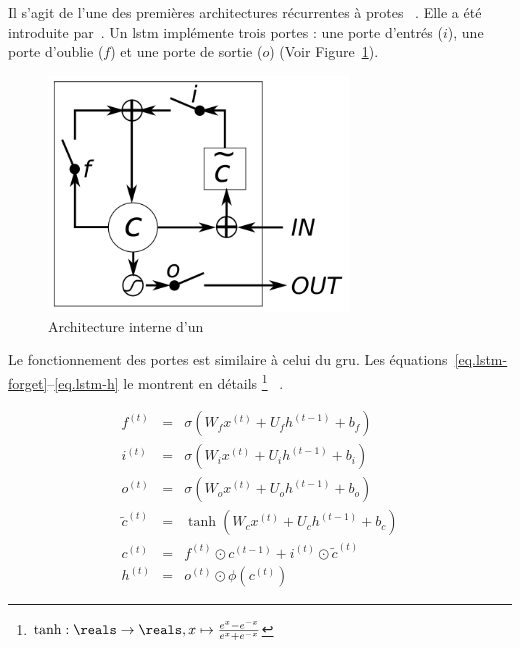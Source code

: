 \subsubsection{}

Il s'agit de l'une des premières architectures récurrentes à protes%
~\cite{Chung_Gulcehre_Cho_Bengio_2014}.
Elle a été introduite par~\cite{Hochreiter_Schmidhuber_1997}.
Un \gls{lstm} implémente trois portes : 
une porte d'entrés (\(i\)), une porte d'oublie (\(f\)) et une porte de sortie (\(o\))%
(Voir Figure~\ref{fig.lstm-circuit}).

\begin{figure}[htb]
    \begin{center}
        \includegraphics[width=8cm]{assets/images/lstm-circuit.png}
    \end{center}
    \caption{Architecture interne d'un ~\cite[Fig. 1a]{Chung_Gulcehre_Cho_Bengio_2014}}
    \label{fig.lstm-circuit}
\end{figure}

Le fonctionnement des portes est similaire à celui du \gls{gru}.
Les équations~\ref{eq.lstm-forget}--\ref{eq.lstm-h} le montrent en détails%
\footnote{\(\tanh:\reals\to\reals, x\mapsto \frac{e^x - e^{-x}}{e^x + e^{-x}}\)}
~\cite{Hochreiter_Schmidhuber_1997}.

\begin{eqnarray}
    \label{eq.lstm-forget}
    f^{(t)} &=&\sigma\left(W_f x^{(t)}+U_f h^{(t-1)}+b_f\right) \\
    \label{eq.lstm-input}
    i^{(t)} &=&\sigma\left(W_i x^{(t)}+U_i h^{(t-1)}+b_i\right) \\
    \label{eq.lstm-out}
    o^{(t)} &=&\sigma\left(W_o x^{(t)}+U_o h^{(t-1)}+b_o\right) \\
    \label{eq.lstm-ctilde}
    \tilde{c}^{(t)} &=&\tanh\left(W_c x^{(t)}+U_c h^{(t-1)}+b_c\right) \\
    \label{eq.lstm-c}
    c^{(t)} &=&f^{(t)} \odot c^{(t-1)}+i^{(t)} \odot \tilde{c}^{(t)} \\
    \label{eq.lstm-h}
    h^{(t)} &=&o^{(t)} \odot \phi\left(c^{(t)}\right)
\end{eqnarray}

